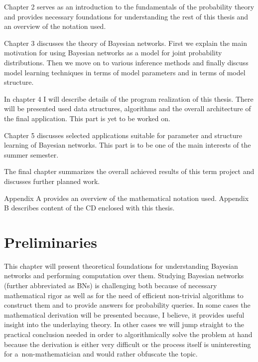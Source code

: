 \documentclass[english,cover]{fitthesis} %
\newcommand{\todo}[1]{{\color{red}#1}}
\begin{document}
\medskip

Chapter 2 serves as an introduction to the fundamentals of the probability theory and provides necessary foundations for understanding the rest of this thesis and an overview of the notation used.

Chapter 3 discusses the theory of Bayesian networks. First we explain the main motivation for using Bayesian networks as a model for joint probability distributions. Then we move on to various inference methods and finally discuss model learning techniques in terms of model parameters and in terms of model structure.

In chapter 4 I will describe details of the program realization of this thesis. There will be presented used data structures, algorithms and the overall architecture of the final application.
This part is yet to be worked on. %

Chapter 5 discusses selected applications suitable for parameter and structure learning of Bayesian networks. This part is to be one of the main interests of the summer semester.

The final chapter summarizes the overall achieved results of this term project and discusses further planned work.

\todo{Appendix A provides an overview of the mathematical notation used.}
\todo{Appendix B describes content of the CD enclosed with this thesis.}































\chapter{Preliminaries}
This chapter will present theoretical foundations for understanding Bayesian networks and performing computation over them. Studying Bayesian networks (further abbreviated as BNs) is challenging both because of necessary mathematical rigor as well as for the need of efficient non-trivial algorithms to construct them and to provide answers for probability queries. In some cases the mathematical derivation will be presented because, I believe, it provides useful insight into the underlaying theory. In other cases we will jump straight to the practical conclusion needed in order to algorithmically solve the problem at hand because the derivation is either very difficult or the process itself is uninteresting for a~non-mathematician and would rather obfuscate the topic.
\end{document}
